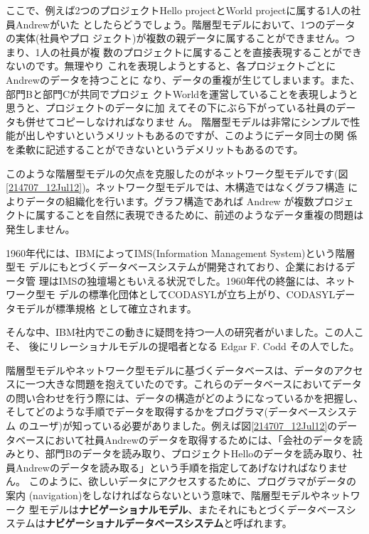 ここで、例えば2つのプロジェクトHello projectとWorld projectに属する1人の社員Andrewがいた
としたらどうでしょう。階層型モデルにおいて、1つのデータの実体(社員やプロ
ジェクト)が複数の親データに属することができません。つまり、1人の社員が複
数のプロジェクトに属することを直接表現することができないのです。無理やり
これを表現しようとすると、各プロジェクトごとにAndrewのデータを持つことに
なり、データの重複が生じてしまいます。また、部門Bと部門Cが共同でプロジェ
クトWorldを運営していることを表現しようと思うと、プロジェクトのデータに加
えてその下にぶら下がっている社員のデータも併せてコピーしなければなりませ
ん。
階層型モデルは非常にシンプルで性能が出しやすいというメリットもあるのですが、このようにデータ同士の関
係を柔軟に記述することができないというデメリットもあるのです。


このような階層型モデルの欠点を克服したのがネットワーク型モデルです(図
\ref{214707_12Jul12})。ネットワーク型モデルでは、木構造ではなくグラフ構造
によりデータの組織化を行います。グラフ構造であれば Andrew が複数プロジェ
クトに属することを自然に表現できるために、前述のようなデータ重複の問題は
発生しません。


1960年代には、IBMによってIMS(Information Management System)という階層型モ
デルにもとづくデータベースシステムが開発されており、企業におけるデータ管
理はIMSの独壇場ともいえる状況でした。1960年代の終盤には、ネットワーク型モ
デルの標準化団体としてCODASYLが立ち上がり、CODASYLデータモデルが標準規格
として確立されます。


そんな中、IBM社内でこの動きに疑問を持つ一人の研究者がいました。この人こそ、
後にリレーショナルモデルの提唱者となる Edgar F. Codd その人でした。


階層型モデルやネットワーク型モデルに基づくデータベースは、データのアクセ
スに一つ大きな問題を抱えていたのです。これらのデータベースにおいてデータ
の問い合わせを行う際には、データの構造がどのようになっているかを把握し、
そしてどのような手順でデータを取得するかをプログラマ(データベースシステム
のユーザ)が知っている必要がありました。例えば図\ref{214707_12Jul12}のデー
タベースにおいて社員Andrewのデータを取得するためには、「会社のデータを読
みとり、部門Bのデータを読み取り、プロジェクトHelloのデータを読み取り、社
員Andrewのデータを読み取る」という手順を指定してあげなければなりません。
このように、欲しいデータにアクセスするために、プログラマがデータの案内
(navigation)をしなければならないという意味で、階層型モデルやネットワーク
型モデルは{\bf ナビゲーショナルモデル}、またそれにもとづくデータベースシ
ステムは{\bf ナビゲーショナルデータベースシステム}と呼ばれます。


